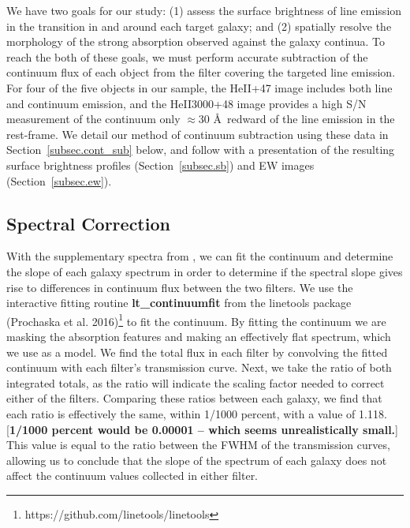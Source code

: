 \documentclass[twocolumn]{aastex6}
\begin{document}
 We have two goals for our study: (1) assess the surface brightness of line emission in the  transition in and around each target galaxy; and (2) spatially resolve the morphology of the strong  absorption observed against the galaxy continua.  To reach the both of these goals, we must perform accurate subtraction of the continuum flux of each object from the filter covering the targeted line emission.  
For four of the five objects in our sample, the HeII+47 image includes both line and continuum emission, and 
the HeII3000+48 image provides a high S/N measurement of the continuum only $\approx30$ \AA\ redward of the line emission in the rest-frame.  We detail our method of continuum subtraction using these data in Section~\ref{subsec.cont_sub} below, and follow with a presentation of the resulting surface brightness profiles (Section~\ref{subsec.sb}) and EW images (Section~\ref{subsec.ew}).


\subsection{Spectral Correction}
With the supplementary spectra from \cite{Rubin_2014}, we can fit the continuum and determine the slope of each galaxy spectrum in order to determine if the spectral slope gives rise to differences in continuum flux between the two filters. We use the interactive fitting routine \textbf{lt\_continuumfit} from the linetools package (Prochaska et al. 2016)\footnote{https://github.com/linetools/linetools} to fit the continuum. By fitting the continuum we are masking the absorption features and making an effectively flat spectrum, which we use as a model. We find the total flux in each filter by convolving the fitted continuum with each filter's transmission curve. Next, we take the ratio of both integrated totals, as the ratio will indicate the scaling factor needed to correct either of the filters. Comparing these ratios between each galaxy, we find that each ratio is effectively the same, within 1/1000 percent, with a value of 1.118. 
[{\bf 1/1000 percent would be 0.00001 -- which seems unrealistically small.}]
This value is equal to the ratio between the FWHM of the transmission curves, allowing us to conclude that the slope of the spectrum of each galaxy does not affect the continuum values collected in either filter.
\end{document}
